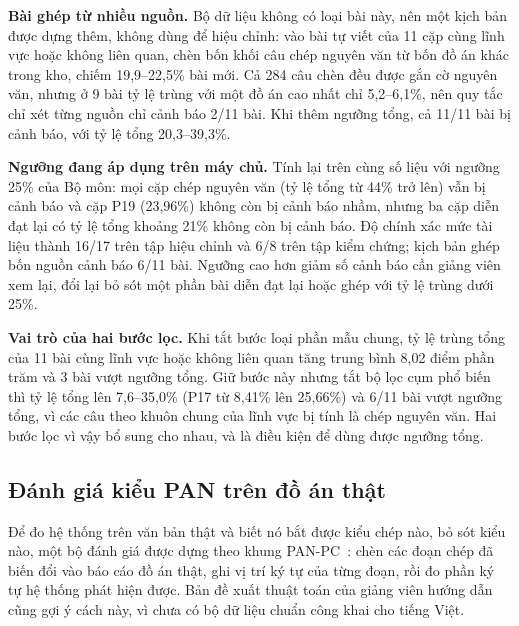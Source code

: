 \documentclass[../main.tex]{subfiles}
\begin{document}
\textbf{Bài ghép từ nhiều nguồn.} Bộ dữ liệu không có loại bài này, nên một kịch bản được dựng thêm, không dùng để hiệu chỉnh: vào bài tự viết của 11 cặp cùng lĩnh vực hoặc không liên quan, chèn bốn khối câu chép nguyên văn từ bốn đồ án khác trong kho, chiếm 19,9--22,5\% bài mới. Cả 284 câu chèn đều được gắn cờ nguyên văn, nhưng ở 9 bài tỷ lệ trùng với một đồ án cao nhất chỉ 5,2--6,1\%, nên quy tắc chỉ xét từng nguồn chỉ cảnh báo 2/11 bài. Khi thêm ngưỡng tổng, cả 11/11 bài bị cảnh báo, với tỷ lệ tổng 20,3--39,3\%.

\textbf{Ngưỡng đang áp dụng trên máy chủ.} Tính lại trên cùng số liệu với ngưỡng 25\% của Bộ môn: mọi cặp chép nguyên văn (tỷ lệ tổng từ 44\% trở lên) vẫn bị cảnh báo và cặp P19 (23,96\%) không còn bị cảnh báo nhầm, nhưng ba cặp diễn đạt lại có tỷ lệ tổng khoảng 21\% không còn bị cảnh báo. Độ chính xác mức tài liệu thành 16/17 trên tập hiệu chỉnh và 6/8 trên tập kiểm chứng; kịch bản ghép bốn nguồn cảnh báo 6/11 bài. Ngưỡng cao hơn giảm số cảnh báo cần giảng viên xem lại, đổi lại bỏ sót một phần bài diễn đạt lại hoặc ghép với tỷ lệ trùng dưới 25\%.

\textbf{Vai trò của hai bước lọc.} Khi tắt bước loại phần mẫu chung, tỷ lệ trùng tổng của 11 bài cùng lĩnh vực hoặc không liên quan tăng trung bình 8,02 điểm phần trăm và 3 bài vượt ngưỡng tổng. Giữ bước này nhưng tắt bộ lọc cụm phổ biến thì tỷ lệ tổng lên 7,6--35,0\% (P17 từ 8,41\% lên 25,66\%) và 6/11 bài vượt ngưỡng tổng, vì các câu theo khuôn chung của lĩnh vực bị tính là chép nguyên văn. Hai bước lọc vì vậy bổ sung cho nhau, và là điều kiện để dùng được ngưỡng tổng.

\subsection{Đánh giá kiểu PAN trên đồ án thật}\label{sec:c4-pan}

Để đo hệ thống trên văn bản thật và biết nó bắt được kiểu chép nào, bỏ sót kiểu nào, một bộ đánh giá được dựng theo khung PAN-PC~\cite{potthast2010}: chèn các đoạn chép đã biến đổi vào báo cáo đồ án thật, ghi vị trí ký tự của từng đoạn, rồi đo phần ký tự hệ thống phát hiện được. Bản đề xuất thuật toán của giảng viên hướng dẫn cũng gợi ý cách này, vì chưa có bộ dữ liệu chuẩn công khai cho tiếng Việt.
\end{document}
